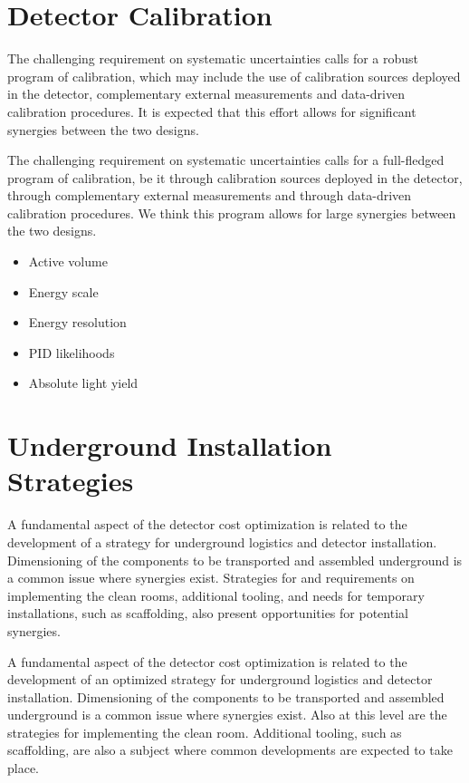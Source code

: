 \section{Detector Calibration}

The challenging requirement on systematic uncertainties calls for a
robust program of calibration, which may include the use of calibration sources
deployed in the detector, complementary external measurements
and data-driven calibration procedures. It is expected that this effort
allows for significant synergies between the two designs.


The challenging requirement on systematic uncertainties calls for a
full-fledged program of calibration, be it through calibration sources
deployed in the detector, through complementary external measurements
and through data-driven calibration procedures. We think this program
allows for large synergies between the two designs.
\begin{itemize}
\item Active volume
\item Energy scale
\item Energy resolution
\item PID likelihoods
\item Absolute light yield	
\end{itemize}


\section{Underground Installation Strategies}

A fundamental aspect of the detector cost optimization is related to
the development of a strategy for underground logistics and
detector installation. Dimensioning of the components to be
transported and assembled underground is a common issue where
synergies exist. Strategies for and requirements on 
implementing the clean rooms, additional tooling, and needs for temporary installations, such as scaffolding,
also present opportunities for potential synergies.


A fundamental aspect of the detector cost optimization is related to
the development of an optimized strategy for underground logistics and
detector installation. Dimensioning of the components to be
transported and assembled underground is a common issue where
synergies exist. Also at this level are the strategies for
implementing the clean room. Additional tooling, such as scaffolding,
are also a subject where common developments are expected to take
place.

